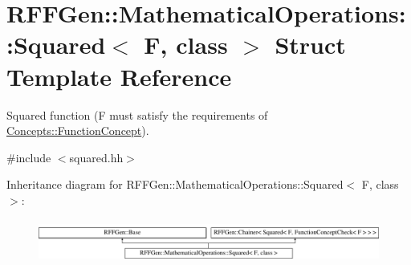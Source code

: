 \hypertarget{structRFFGen_1_1MathematicalOperations_1_1Squared}{\section{R\-F\-F\-Gen\-:\-:Mathematical\-Operations\-:\-:Squared$<$ F, class $>$ Struct Template Reference}
\label{structRFFGen_1_1MathematicalOperations_1_1Squared}
}


Squared function (F must satisfy the requirements of \hyperlink{structRFFGen_1_1Concepts_1_1FunctionConcept}{Concepts\-::\-Function\-Concept}).  




{\ttfamily \#include $<$squared.\-hh$>$}

Inheritance diagram for R\-F\-F\-Gen\-:\-:Mathematical\-Operations\-:\-:Squared$<$ F, class $>$\-:\begin{figure}[H]
\begin{center}
\leavevmode
\includegraphics[height=1.421320cm]{structRFFGen_1_1MathematicalOperations_1_1Squared}
\end{center}
\end{figure}
